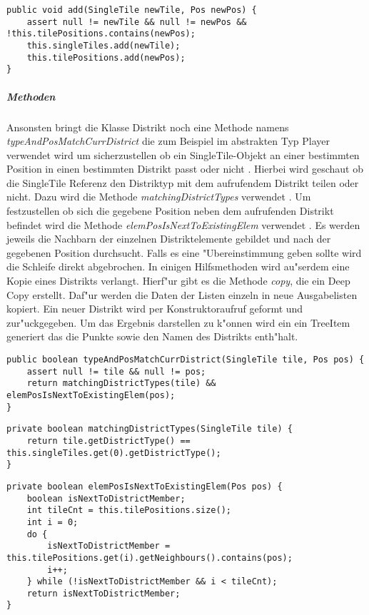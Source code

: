 \begin{lstlisting}[style=CodeHighlighting,float,caption=District - add,label=district_add]
public void add(SingleTile newTile, Pos newPos) {
    assert null != newTile && null != newPos && !this.tilePositions.contains(newPos);
    this.singleTiles.add(newTile);
    this.tilePositions.add(newPos);
}
\end{lstlisting}

\subparagraph{Methoden}
\label{spar:districtMethoden}
Ansonsten bringt die Klasse Distrikt noch eine Methode namens \emph{typeAndPosMatchCurrDistrict} die zum Beispiel im abstrakten Typ Player verwendet wird um sicherzustellen ob ein SingleTile-Objekt an einer bestimmten Position in einen bestimmten Distrikt passt oder nicht . Hierbei wird geschaut ob die SingleTile Referenz den Distriktyp mit dem aufrufendem Distrikt teilen oder nicht. Dazu wird die Methode \emph{matchingDistrictTypes} verwendet . Um festzustellen ob sich die gegebene Position neben dem aufrufenden Distrikt befindet wird die Methode \emph{elemPosIsNextToExistingElem} verwendet . Es werden jeweils die Nachbarn der einzelnen Distriktelemente gebildet und nach der gegebenen Position durchsucht. Falls es eine "Ubereinstimmung geben sollte wird die Schleife direkt abgebrochen. In einigen Hilfsmethoden wird au"serdem eine Kopie eines Distrikts verlangt. Hierf"ur gibt es die Methode \emph{copy}, die ein Deep Copy erstellt. Daf"ur werden die Daten der Listen einzeln in neue Ausgabelisten kopiert. Ein neuer Distrikt wird per Konstruktoraufruf geformt und zur"uckgegeben. 
Um das Ergebnis darstellen zu k"onnen wird ein ein TreeItem generiert das die Punkte sowie den Namen des Distrikts enth"halt. 


\begin{lstlisting}[style=CodeHighlighting,float,caption=District - typeAndPosMatchCurrDistrict,label=lst:district_typeAndPosMatchCurrDistrict]
public boolean typeAndPosMatchCurrDistrict(SingleTile tile, Pos pos) {
    assert null != tile && null != pos;
    return matchingDistrictTypes(tile) && elemPosIsNextToExistingElem(pos);
}
\end{lstlisting}

\begin{lstlisting}[style=CodeHighlighting,float,caption=District - matchingDistrictTypes,label=lst:district_matchingDistrictTypes]
private boolean matchingDistrictTypes(SingleTile tile) {
    return tile.getDistrictType() == this.singleTiles.get(0).getDistrictType();
}
\end{lstlisting}
\begin{lstlisting}[style=CodeHighlighting,float,caption=District - elemPosIsNextToExistingElem,label=lst:district_elemPosIsNextToExistingElem]
private boolean elemPosIsNextToExistingElem(Pos pos) {
    boolean isNextToDistrictMember;
    int tileCnt = this.tilePositions.size();
    int i = 0;
    do {
        isNextToDistrictMember = this.tilePositions.get(i).getNeighbours().contains(pos);
        i++;
    } while (!isNextToDistrictMember && i < tileCnt);
    return isNextToDistrictMember;
}
\end{lstlisting}